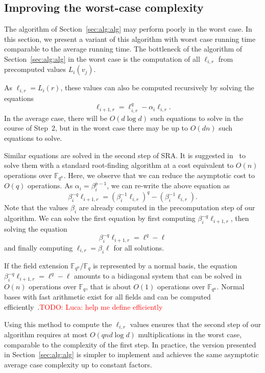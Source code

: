 \documentclass{sig-alternate}
\newcommand{\ff}[1]{\mathbb{F}_{#1}}
\newcommand{\fq}{\ff{q}}
\newcommand{\fqn}{\ff{q^n}}
\newcounter{algo}
\newcommand{\todo}[1]{\textcolor{red}{TODO: #1}}
\begin{document}
\subsection{Improving the worst-case complexity\label{sec:ext:variant}}

The algorithm of Section~\ref{sec:alg:alg} may perform poorly in the worst case. In this section, we present a variant of this algorithm with worst case running time comparable to the average running time.
%
The bottleneck of the algorithm of Section~\ref{sec:alg:alg} in the worst case is the computation of all $\ell_{i,r}$ from precomputed values $L_i(v_j)$.

As $\ell_{i,r}=L_i(r)$, these values can also be computed recursively by solving the equations
$$\ell_{i+1,r}=\ell_{i,r}^q-\alpha_i\ell_{i,r}.$$
%
In the average case, there will be $O(d\log d)$ such equations to solve in the course of Step~2, but in the worst case there may be up to $O(dn)$ such equations to solve.

Similar equations are solved in the second step of SRA. It is suggested in~\cite{cgUCL-P14} to solve them with a standard root-finding algorithm at a cost equivalent to $O(n)$ operations over $\fqn$.
Here, we observe that we can reduce the asymptotic cost to $O(q)$ operations. As $\alpha_i=\beta_i^{p-1}$, we can re-write the above equation as 
$$\beta_i^{-q}\ell_{i+1,r}=(\beta_i^{-1}\ell_{i,r})^q-(\beta_i^{-1}\ell_{i,r}).$$ 
Note that the values $\beta_i$ are already computed in the precomputation step of our algorithm. We can solve the first equation by first computing $\beta_i^{-q}\ell_{i+1,r}$, then solving the equation 
$$\beta_i^{-q}\ell_{i+1,r}=\ell^q-\ell$$
and finally computing $\ell_{i,r}=\beta_i\ell$ for all solutions.

If the field extension $\fqn/\fq$ is represented by a normal basis, the equation $\beta_i^{-q}\ell_{i+1,r}=\ell^q-\ell$ amounts to a bidiagonal system that can be solved in $O(n)$ operations over $\fq$, that is about $O(1)$ operations over $\fqn$.
%
Normal bases with fast arithmetic exist for all fields and can be computed efficiently~\cite{Couveignes-Lercier}.\todo{Luca: help me define efficiently}

Using this method to compute the $\ell_{i,r}$ values ensures that the second step of our algorithm requires at most $O(qnd\log d)$ multiplications in the worst case, comparable to the complexity of the first step.
%
In practice, the version presented in Section~\ref{sec:alg:alg} is simpler to implement and achieves the same asymptotic average case complexity up to constant factors. 
\end{document}
